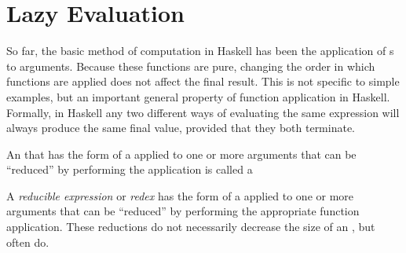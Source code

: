 \section{Lazy Evaluation}\label{sec:Lazy_Evaluation}
So far, the basic method of computation in Haskell has been the application of s to arguments.
Because these functions are pure, changing the order in which functions are applied does not affect the final result.
This is not specific to simple examples, but an important general property of function application in Haskell.
Formally, in Haskell any two different ways of evaluating the same expression will always produce the same final value, provided that they both terminate.

An  that has the form of a  applied to one or more arguments that can be ``reduced'' by performing the application is called a 

\begin{definition}\label{def:Reducible_Expression}
  A \emph{reducible expression} or \emph{redex} has the form of a  applied to one or more arguments that can be ``reduced'' by performing the appropriate function application.
  These reductions do not necessarily decrease the size of an , but often do.
\end{definition}


